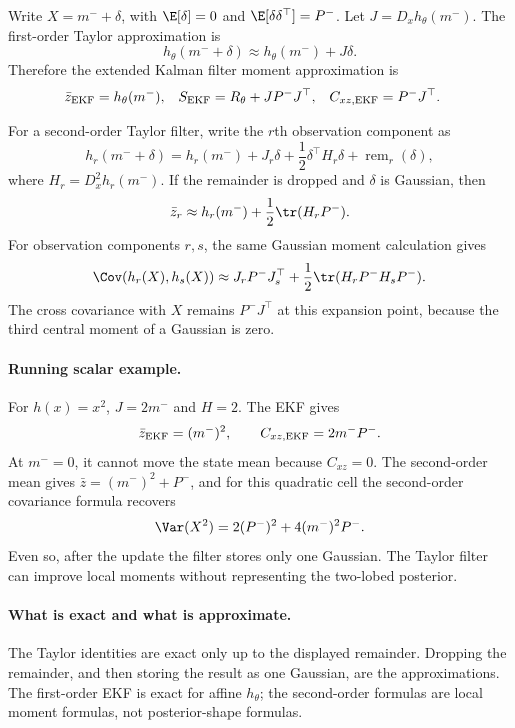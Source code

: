 Write \(X=m^-+\delta\), with \(\E[\delta]=0\) and
\(\E[\delta\delta^\top]=P^-\).  Let \(J=D_xh_\theta(m^-)\).  The first-order
Taylor approximation is
\[
  h_\theta(m^-+\delta)\approx h_\theta(m^-)+J\delta .
\]
Therefore the extended Kalman filter moment approximation is
\begin{align}
  \bar z_{\rm EKF} &= h_\theta(m^-),&
  S_{\rm EKF} &= R_\theta+JP^-J^\top,&
  C_{xz,{\rm EKF}} &= P^-J^\top .
  \label{eq:bf-hd-ekf-moments}
\end{align}

For a second-order Taylor filter, write the \(r\)th observation component as
\[
  h_r(m^-+\delta)
  =
  h_r(m^-)+J_r\delta+\frac12\delta^\top H_r\delta
  +\operatorname{rem}_r(\delta),
\]
where \(H_r=D_x^2h_r(m^-)\).  If the remainder is dropped and \(\delta\) is
Gaussian, then
\begin{equation}
  \bar z_r
  \approx
  h_r(m^-)+\frac12\tr(H_rP^-).
  \label{eq:bf-hd-second-order-mean}
\end{equation}
For observation components \(r,s\), the same Gaussian moment calculation gives
\begin{equation}
  \Cov(h_r(X),h_s(X))
  \approx
  J_rP^-J_s^\top
  +\frac12\tr(H_rP^-H_sP^-).
  \label{eq:bf-hd-second-order-cov}
\end{equation}
The cross covariance with \(X\) remains \(P^-J^\top\) at this expansion point,
because the third central moment of a Gaussian is zero.

\paragraph{Running scalar example.}
For \(h(x)=x^2\), \(J=2m^-\) and \(H=2\).  The EKF gives
\[
  \bar z_{\rm EKF}=(m^-)^2,\qquad
  C_{xz,{\rm EKF}}=2m^-P^-.
\]
At \(m^-=0\), it cannot move the state mean because \(C_{xz}=0\).  The
second-order mean gives \(\bar z=(m^-)^2+P^-\), and for this quadratic cell the
second-order covariance formula recovers
\[
  \Var(X^2)=2(P^-)^2+4(m^-)^2P^-.
\]
Even so, after the update the filter stores only one Gaussian.  The Taylor
filter can improve local moments without representing the two-lobed posterior.

\paragraph{What is exact and what is approximate.}
The Taylor identities are exact only up to the displayed remainder.  Dropping
the remainder, and then storing the result as one Gaussian, are the
approximations.  The first-order EKF is exact for affine \(h_\theta\); the
second-order formulas are local moment formulas, not posterior-shape formulas.

